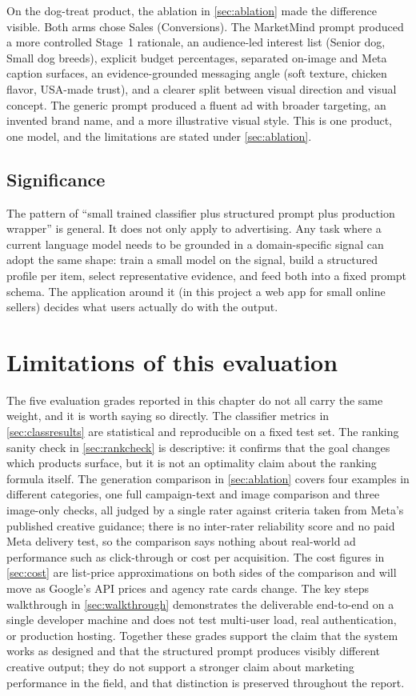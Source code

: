 \documentclass[12pt,a4paper]{report}
\begin{document}
On the dog-treat product, the ablation in \cref{sec:ablation} made the difference visible. Both arms chose Sales (Conversions). The MarketMind prompt produced a more controlled Stage~1 rationale, an audience-led interest list (Senior dog, Small dog breeds), explicit budget percentages, separated on-image and Meta caption surfaces, an evidence-grounded messaging angle (soft texture, chicken flavor, USA-made trust), and a clearer split between visual direction and visual concept. The generic prompt produced a fluent ad with broader targeting, an invented brand name, and a more illustrative visual style. This is one product, one model, and the limitations are stated under \cref{sec:ablation}.

\subsection*{Significance}

The pattern of ``small trained classifier plus structured prompt plus production wrapper'' is general. It does not only apply to advertising. Any task where a current language model needs to be grounded in a domain-specific signal can adopt the same shape: train a small model on the signal, build a structured profile per item, select representative evidence, and feed both into a fixed prompt schema. The application around it (in this project a web app for small online sellers) decides what users actually do with the output.

\section{Limitations of this evaluation}
\label{sec:evallimits}

The five evaluation grades reported in this chapter do not all carry the same weight, and it is worth saying so directly. The classifier metrics in \cref{sec:classresults} are statistical and reproducible on a fixed test set. The ranking sanity check in \cref{sec:rankcheck} is descriptive: it confirms that the goal changes which products surface, but it is not an optimality claim about the ranking formula itself. The generation comparison in \cref{sec:ablation} covers four examples in different categories, one full campaign-text and image comparison and three image-only checks, all judged by a single rater against criteria taken from Meta's published creative guidance; there is no inter-rater reliability score and no paid Meta delivery test, so the comparison says nothing about real-world ad performance such as click-through or cost per acquisition. The cost figures in \cref{sec:cost} are list-price approximations on both sides of the comparison and will move as Google's API prices and agency rate cards change. The key steps walkthrough in \cref{sec:walkthrough} demonstrates the deliverable end-to-end on a single developer machine and does not test multi-user load, real authentication, or production hosting. Together these grades support the claim that the system works as designed and that the structured prompt produces visibly different creative output; they do not support a stronger claim about marketing performance in the field, and that distinction is preserved throughout the report.
\end{document}
